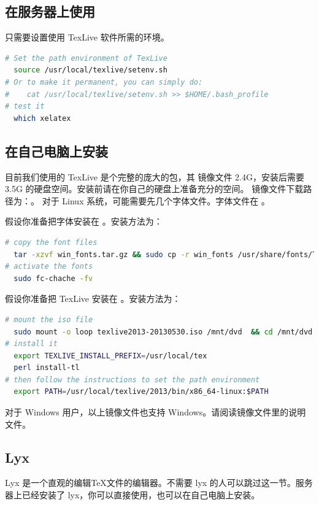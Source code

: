 \subsection{在服务器上使用}
只需要设置使用 TexLive 软件所需的环境。
\begin{lstlisting}[language=sh,caption={在服务器上设置使用 TexLive 的环境}]
# Set the path environment of TexLive 
  source /usr/local/texlive/setenv.sh
# Or to make it permanent, you can simply do:
#    cat /usr/local/texlive/setenv.sh >> $HOME/.bash_profile
# test it
  which xelatex
\end{lstlisting}

\subsection{在自己电脑上安装}
目前我们使用的 TexLive 是个完整的庞大的包，其  镜像文件 2.4G，安装后需要 3.5G 的硬盘空间。安装前请在你自己的硬盘上准备充分的空间。
镜像文件下载路径为：。
对于 Linux 系统，可能需要先几个字体文件。字体文件在 。

假设你准备把字体安装在 。安装方法为：
\begin{lstlisting}[language=sh,caption={安装字体}]
# copy the font files
  tar -xzvf win_fonts.tar.gz && sudo cp -r win_fonts /usr/share/fonts/TTF/
# activate the fonts
  sudo fc-chache -fv
\end{lstlisting}

假设你准备把 TexLive 安装在  。安装方法为：
\begin{lstlisting}[language=sh,caption={安装 TexLive}]
# mount the iso file
  sudo mount -o loop texlive2013-20130530.iso /mnt/dvd  && cd /mnt/dvd
# install it
  export TEXLIVE_INSTALL_PREFIX=/usr/local/tex
  perl install-tl
# then follow the instructions to set the path environment
  export PATH=/usr/local/texlive/2013/bin/x86_64-linux:$PATH
\end{lstlisting}

对于 Windows 用户，以上镜像文件也支持 Windows。请阅读镜像文件里的说明文件。

\subsection{Lyx}
Lyx 是一个直观的编辑\TeX 文件的编辑器。不需要 lyx 的人可以跳过这一节。服务器上已经安装了 lyx，你可以直接使用，也可以在自己电脑上安装。


